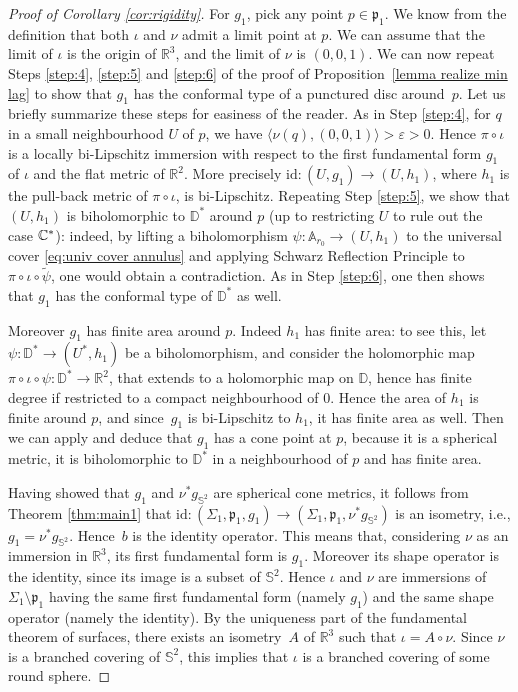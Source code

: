 \documentclass[11pt]{article}
\newcommand{\ie}{i.e.,\xspace}
\let\epsilon\varepsilon
\newcounter{steps}
\theoremstyle{definition}
\newcommand{\R}{{\mathbb R}}
\begin{document}
\begin{proof}[Proof of Corollary \ref{cor:rigidity}]
For $g_1$, pick any point $p\in\mathfrak p_1$. We know from the definition that both $\iota$ and $\nu$ admit a limit point at $p$. We can assume that the limit of $\iota$ is the origin of $\R^3$, and the limit of $\nu$ is $(0,0,1)$. We can now repeat Steps \ref{step:4}, \ref{step:5} and \ref{step:6} of the proof of Proposition~\ref{lemma realize min lag} to show that $g_1$ has the conformal type of a punctured disc around~$p$.
Let us briefly summarize these steps for easiness of the reader.
As in Step \ref{step:4}, for $q$ in a small neighbourhood $U$ of $p$, we have $\langle\nu(q),(0,0,1)\rangle>\epsilon>0$. Hence $\pi\circ \iota$ is a locally bi-Lipschitz immersion with respect to the first fundamental form $g_1$ of $\iota$ and the flat metric of $\R^2$. More precisely $\mathrm{id}:(U,g_1)\to (U,h_1)$, where $h_1$ is the pull-back metric of $\pi\circ \iota$, is bi-Lipschitz. Repeating Step \ref{step:5}, we show that $(U,h_1)$ is biholomorphic to $\mathbb D^*$ around $p$ (up to restricting $U$ to rule out the case ${\mathbb C}^*$): indeed, by lifting a biholomorphism $\psi:{\mathbb A_{r_0}}\to(U,h_1)$ to the universal cover \eqref{eq:univ cover annulus} and applying Schwarz Reflection Principle to $\pi\circ\iota\circ\widetilde\psi$, one would obtain a contradiction. As in Step \ref{step:6}, one then shows that $g_1$ has the conformal type of $\mathbb D^*$ as well.

Moreover $g_1$ has finite area around $p$. Indeed $h_1$ has finite area: to see this, let $\psi:\mathbb D^*\to (U^*,h_1)$ be a biholomorphism, and consider the holomorphic map $\pi\circ \iota\circ\psi:\mathbb D^*\to\R^2$, that extends to a holomorphic map on $\mathbb D$, hence has finite degree if restricted to a compact neighbourhood of $0$. Hence the area of $h_1$ is finite around $p$, and since~$g_1$ is bi-Lipschitz to $h_1$, it has finite area as well. Then we can apply \cite[Prop.\,4]{zbMATH04034587} and deduce that $g_1$ has a cone point at $p$, because it is a spherical metric, it is biholomorphic to $\mathbb D^*$ in a neighbourhood of $p$ and has finite area.

Having showed that $g_1$ and $\nu^*g_{\mathbb S^2}$ are spherical cone metrics, it follows from Theorem \ref{thm:main1} that $\mathrm{id}:(\Sigma_1,\mathfrak p_1,g_1)\to (\Sigma_1,\mathfrak p_1,\nu^*g_{\mathbb S^2})$ is an isometry, \ie $g_1=\nu^*g_{\mathbb S^2}$. Hence~$b$ is the identity operator. This means that, considering $\nu$ as an immersion in $\R^3$, its first fundamental form is $g_1$. Moreover its shape operator is the identity, since its image is a subset of $\mathbb S^2$. Hence $\iota$ and $\nu$ are immersions of $\Sigma_1\setminus\mathfrak p_1$ having the same first fundamental form (namely $g_1$) and the same shape operator (namely the identity). By the uniqueness part of the fundamental theorem of surfaces, there exists an isometry~$A$ of $\R^3$ such that $\iota=A\circ\nu$. Since $\nu$ is a branched covering of $\mathbb S^2$, this implies that $\iota$ is a branched covering of some round sphere.
\end{proof}
\end{document}
